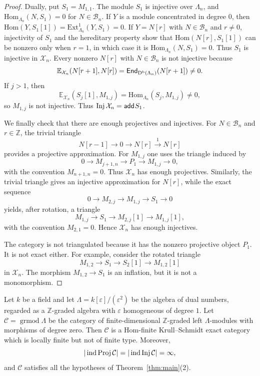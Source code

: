 \documentclass[11pt, twoside]{article}
\def\C{\mathcal{C}}
\def\E{\mathbb{E}}
\numberwithin{equation}{section}
\newcommand{\add}{\mathsf{add}\hspace{.01in}}
\def\End{\mathsf{End}}
\def\Ext{\mbox{Ext}}
\def\Hom{\mbox{Hom}}
\begin{document}
\begin{proof}
Dually, put $S_1=M_{1,1}$.  The module $S_1$ is injective over
$\Lambda_n$, and $\Hom_{\Lambda_n}(N,S_1)=0$ for
$N\in\mathcal B_n$.  If $Y$ is a module concentrated in degree $0$, then
$\Hom(Y,S_1[1])=\Ext^1_{\Lambda_n}(Y,S_1)=0$.  If
$Y=N[r]$ with $N\in\mathcal B_n$ and $r\ne0$, injectivity of $S_1$ and
the hereditary property show that $\Hom(N[r],S_1[1])$ can be nonzero only
when $r=1$, in which case it is $\Hom_{\Lambda_n}(N,S_1)=0$.
Thus $S_1$ is injective in $\mathcal X_n$.  Every nonzero
$N[r]$ with $N\in\mathcal B_n$ is not injective because
\[
 \E_{\mathcal X_n}(N[r+1],N[r])
 =\End_{\Db(\Lambda_n)}(N[r+1])\ne0.
\]
If $j>1$, then
\[
 \E_{\mathcal X_n}(S_j[1],M_{1,j})
 =\Hom_{\Lambda_n}(S_j,M_{1,j})\ne0,
\]
so $M_{1,j}$ is not injective.  Thus
$\Inj\mathcal X_n=\add S_1$.

We finally check that there are enough projectives and injectives.  For
$N\in\mathcal B_n$ and $r\in\mathbb Z$, the trivial triangle
\[
 N[r-1]\longrightarrow0\longrightarrow N[r]
 \xrightarrow{1}N[r]
\]
provides a projective approximation.  For $M_{1,j}$ one uses the triangle
induced by
\[
 0\longrightarrow M_{j+1,n}\longrightarrow P_1
 \longrightarrow M_{1,j}\longrightarrow0,
\]
with the convention $M_{n+1,n}=0$.  Thus $\mathcal X_n$ has enough
projectives.  Similarly, the trivial triangle gives an injective
approximation for $N[r]$, while the exact sequence
\[
 0\longrightarrow M_{2,j}\longrightarrow M_{1,j}
 \longrightarrow S_1\longrightarrow0
\]
yields, after rotation, a triangle
\[
 M_{1,j}\longrightarrow S_1\longrightarrow M_{2,j}[1]
 \longrightarrow M_{1,j}[1],
\]
with the convention $M_{2,1}=0$.  Hence $\mathcal X_n$ has enough
injectives.

The category is not triangulated because it has the nonzero projective object
$P_1$.  It is not exact either.  For example, consider the rotated triangle
$$
 M_{1,2}\longrightarrow S_1\longrightarrow S_2[1]
 \longrightarrow M_{1,2}[1]
$$
in $\mathcal X_n$.  The morphism $M_{1,2}\to S_1$ is an inflation, but it is not a monomorphism.
\end{proof}



\begin{example}\label{ex:graded-dual-numbers}
Let $k$ be a field and let
$
 \Lambda=k[\varepsilon]/(\varepsilon^2)
$
be the algebra of dual numbers, regarded as a $\mathbb Z$-graded algebra
with $\varepsilon$ homogeneous of degree $1$.  Let
$\C=\operatorname{grmod}\Lambda$ be the category of finite-dimensional
$\mathbb Z$-graded left $\Lambda$-modules with morphisms of degree zero.
Then $\C$ is a Hom-finite Krull--Schmidt exact category which is locally
finite but not of finite type.  Moreover,
\[
 |\ind\Proj\C|=|\ind\Inj\C|=\infty,
\]
and $\C$ satisfies all the hypotheses of Theorem~\ref{thm:main}(2).
\end{example}
\end{document}
